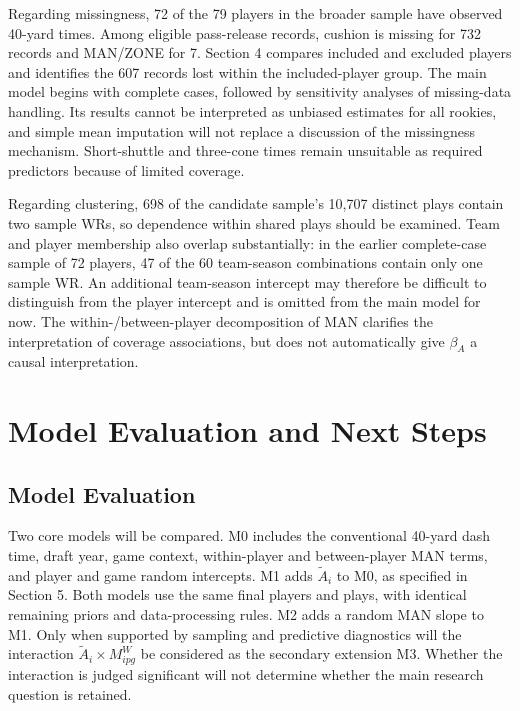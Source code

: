 \documentclass[a4paper,11pt]{article}
\begin{document}
Regarding missingness, 72 of the 79 players in the broader sample have observed 40-yard times. Among eligible pass-release records, cushion is missing for 732 records and MAN/ZONE for 7. Section 4 compares included and excluded players and identifies the 607 records lost within the included-player group. The main model begins with complete cases, followed by sensitivity analyses of missing-data handling. Its results cannot be interpreted as unbiased estimates for all rookies, and simple mean imputation will not replace a discussion of the missingness mechanism. Short-shuttle and three-cone times remain unsuitable as required predictors because of limited coverage.

Regarding clustering, 698 of the candidate sample's 10,707 distinct plays contain two sample WRs, so dependence within shared plays should be examined. Team and player membership also overlap substantially: in the earlier complete-case sample of 72 players, 47 of the 60 team-season combinations contain only one sample WR. An additional team-season intercept may therefore be difficult to distinguish from the player intercept and is omitted from the main model for now. The within-/between-player decomposition of MAN clarifies the interpretation of coverage associations, but does not automatically give $\beta_A$ a causal interpretation.

\section{Model Evaluation and Next Steps}

\subsection{Model Evaluation}

Two core models will be compared. M0 includes the conventional 40-yard dash time, draft year, game context, within-player and between-player MAN terms, and player and game random intercepts. M1 adds $\widetilde A_i$ to M0, as specified in Section 5. Both models use the same final players and plays, with identical remaining priors and data-processing rules. M2 adds a random MAN slope to M1. Only when supported by sampling and predictive diagnostics will the interaction $\widetilde A_i\times M^W_{ipg}$ be considered as the secondary extension M3. Whether the interaction is judged significant will not determine whether the main research question is retained.
\end{document}
